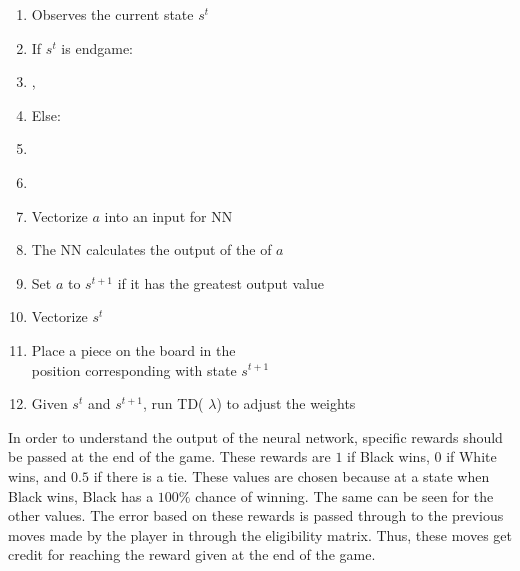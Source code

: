 \documentclass{sig-alternate-05-2015}
\begin{document}
\begin{enumerate}
\itemsep0em 
\item Observes the current state $s^t$
\item  If $s^t$ is endgame:
\item  \hspace*{.5cm}, \\  \hspace*{.5cm}
\item   Else:
\item   \hspace*{.5cm} \\  \hspace*{.5cm}
\item   \hspace*{.5cm}
\item  \hspace*{1cm}Vectorize $a$ into an input for NN
\item \hspace*{1cm}The NN calculates the output of the of $a$
\item \hspace*{1cm}Set $a$ to $s^{t+1}$ if it has the greatest output value
\item   \hspace*{.5cm}Vectorize $s^t$
\item   \hspace*{.5cm}Place a piece on the board in the \\ \hspace*{.5cm} position corresponding with state $s^{t+1}$
\item   Given $s^t$ and $s^{t+1}$, run TD( $\lambda$) to adjust the weights
\end{enumerate}

In order to understand the output of the neural network, specific rewards should be passed at the end of the game. These rewards are $1$ if Black wins, $0$ if White wins, and $0.5$ if there is a tie. These values are chosen because at a state when Black wins, Black has a $100\%$ chance of winning. The same can be seen for the other values. The error based on these rewards is passed through to the previous moves made by the player in through the eligibility matrix. Thus, these moves get credit for reaching the reward given at the end of the game.
\end{document}
